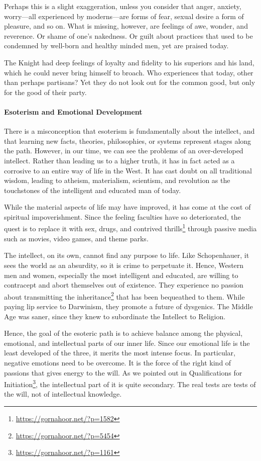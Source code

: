 Perhaps this is a slight exaggeration, unless you consider that anger, anxiety, worry---all experienced by moderns---are forms of fear, sexual desire a form of pleasure, and so on. What is missing, however, are feelings of awe, wonder, and reverence. Or shame of one's nakedness. Or guilt about practices that used to be condemned by well-born and healthy minded men, yet are praised today.

The Knight had deep feelings of loyalty and fidelity to his superiors and his land, which he could never bring himself to broach. Who experiences that today, other than perhaps partisans? Yet they do not look out for the common good, but only for the good of their party.

\paragraph{Esoterism and Emotional Development}


There is a misconception that esoterism is fundamentally about the intellect, and that learning new facts, theories, philosophies, or systems represent stages along the path. However, in our time, we can see the problems of an over-developed intellect. Rather than leading us to a higher truth, it has in fact acted as a corrosive to an entire way of life in the West. It has cast doubt on all traditional wisdom, leading to atheism, materialism, scientism, and revolution as the touchstones of the intelligent and educated man of today.

While the material aspects of life may have improved, it has come at the cost of spiritual impoverishment. Since the feeling faculties have so deteriorated, the quest is to replace it with sex, drugs, and contrived thrills\footnote{\url{https://gornahoor.net/?p=1582}} through passive media such as movies, video games, and theme parks.

The intellect, on its own, cannot find any purpose to life. Like Schopenhauer, it sees the world as an absurdity, so it is crime to perpetuate it. Hence, Western men and women, especially the most intelligent and educated, are willing to contracept and abort themselves out of existence. They experience no passion about transmitting the inheritance\footnote{\url{https://gornahoor.net/?p=5454}} that has been bequeathed to them. While paying lip service to Darwinism, they promote a future of dysgenics. The Middle Age was saner, since they knew to subordinate the Intellect to Religion.

Hence, the goal of the esoteric path is to achieve balance among the physical, emotional, and intellectual parts of our inner life. Since our emotional life is the least developed of the three, it merits the most intense focus. In particular, negative emotions need to be overcome. It is the force of the right kind of passions that gives energy to the will. As we pointed out in Qualifications for Initiation\footnote{\url{https://gornahoor.net/?p=1161}}, the intellectual part of it is quite secondary. The real tests are tests of the will, not of intellectual knowledge.

